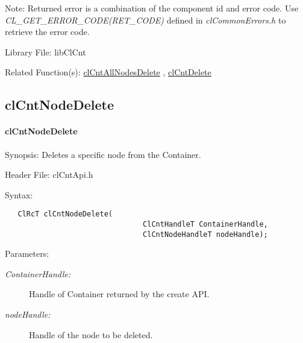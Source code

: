 \begin{Desc}
\item[Note:]Returned error is a combination of the component id and error code. Use \textit{CL\_\-GET\_\-ERROR\_\-CODE(RET\_\-CODE)} defined in \textit{clCommonErrors.h} to retrieve the error code.\end{Desc}
\begin{Desc}
\item[Library File:]lib\-Cl\-Cnt\end{Desc}
\begin{Desc}
\item[Related Function(s):]\hyperlink{pagecnt106}{cl\-Cnt\-All\-Nodes\-Delete} , \hyperlink{pagecnt120}{cl\-Cnt\-Delete} \end{Desc}


\newpage
\subsection{clCntNodeDelete}
\hypertarget{pagecnt108}{}\paragraph{cl\-Cnt\-Node\-Delete}\label{pagecnt108}
\begin{Desc}
\item[Synopsis:]Deletes a specific node from the Container.\end{Desc}
\begin{Desc}
\item[Header File:]clCntApi.h\end{Desc}
\begin{Desc}
\item[Syntax:]

\footnotesize\begin{verbatim}   ClRcT clCntNodeDelete(
                          		ClCntHandleT ContainerHandle,
                          		ClCntNodeHandleT nodeHandle);
\end{verbatim}
\normalsize
\end{Desc}
\begin{Desc}
\item[Parameters:]
\begin{description}
\item[{\em Container\-Handle:}]Handle of Container returned by the create API. 
\item[{\em node\-Handle:}]Handle of the node to be deleted.\end{description}
\end{Desc}
